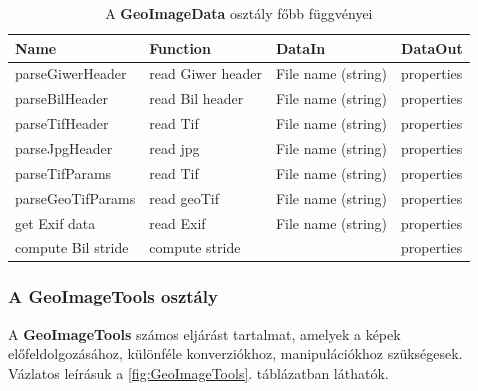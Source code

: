 \documentclass[a4paper,12pt]{article}
\begin{document}
\begin{table}
\begin{small}	
\begin{tabular}{|l|l|l|l|}
	\hline
	\textbf{Name} & \textbf{Function} & \textbf{DataIn} & \textbf{DataOut}\\	
	\hline
	parseGiwerHeader & read Giwer header & File name (string) & properties \\
		\hline
	parseBilHeader & read Bil header & File name (string) & properties \\
		\hline
	parseTifHeader & read Tif & File name (string) & properties \\
		\hline
	parseJpgHeader & read jpg & File name (string) & properties \\
		\hline
	parseTifParams & read Tif & File name (string) & properties \\
		\hline
	parseGeoTifParams & read geoTif & File name (string) & properties \\
		\hline
	get Exif data& read Exif & File name (string) & properties \\
		\hline
	compute Bil stride & compute stride &  & properties \\
	\hline
\end{tabular}
\end{small}
	\caption{A \textbf{GeoImageData} osztály főbb függvényei}
	\label{fig:GeoImageData}
\end{table}


\subsubsection{A \textbf{GeoImageTools} osztály}

A \textbf{GeoImageTools} számos eljárást tartalmat, amelyek a képek előfeldolgozásához, különféle konverziókhoz, manipulációkhoz szükségesek. Vázlatos leírásuk a \ref{fig:GeoImageTools}. táblázatban láthatók.
\end{document}
